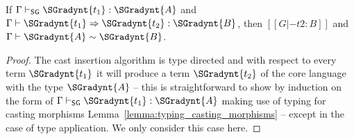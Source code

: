 \begin{lemma}
  \label{lemma:type_preservation_for_cast_insertion}
  If $ \Gamma  \vdash_{\mathsf{SG} }  \SGradynt{t_{{\mathrm{1}}}}  :  \SGradynt{A} $ and $ \Gamma  \vdash  \SGradynt{t_{{\mathrm{1}}}}  \Rightarrow  \SGradynt{t_{{\mathrm{2}}}}  :  \SGradynt{B} $, then $[[G |- t2 : B]]$ and $ \Gamma  \vdash  \SGradynt{A}  \sim  \SGradynt{B} $.
\end{lemma}
\begin{proof}
  The cast insertion algorithm is type directed and with respect to every term $\SGradynt{t_{{\mathrm{1}}}}$
  it will produce a term $\SGradynt{t_{{\mathrm{2}}}}$ of the core language with the type $\SGradynt{A}$ --
  this is straightforward to show by induction on the form of $ \Gamma  \vdash_{\mathsf{SG} }  \SGradynt{t_{{\mathrm{1}}}}  :  \SGradynt{A} $ making
  use of typing for casting morphisms Lemma~\ref{lemma:typing_casting_morphisms} -- except in
  the case of type application.  We only consider this case here.


\end{proof}
